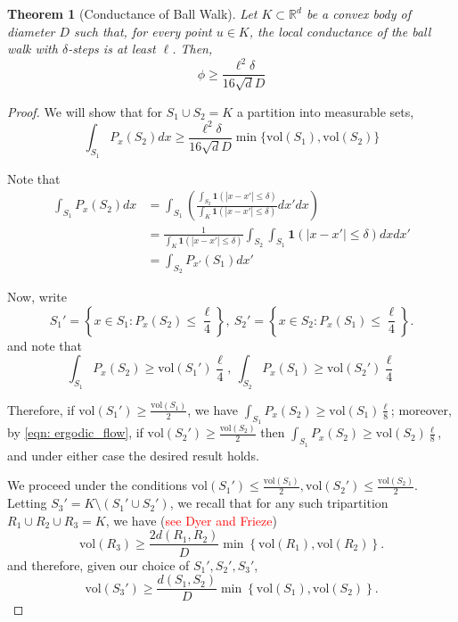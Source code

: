 \documentclass{article}
\newcommand{\Reals}{\mathbb{R}}
\newcommand{\abs}[1]{\left \lvert #1 \right \rvert}
\newcommand{\vol}{\mathrm{vol}}
\newcommand{\set}[1]{\left\{#1\right\}}
\newcommand{\Rd}{\Reals^d}
\newcommand{\1}{\mathbf{1}}
\theoremstyle{alden}
\theoremstyle{aldenthm}
\newtheorem{theorem}{Theorem}
\theoremstyle{remark}
\begin{document}
\begin{theorem}[Conductance of Ball Walk]
	\label{thm: ball_walk_conductance}
	Let $K \subset \Rd$ be a convex body of diameter $D$ such that, for every point $u \in K$, the local conductance of the ball walk with $\delta$-steps is at least $\ell$. Then,
	\begin{equation*}
	\phi \geq \frac{\ell^2 \delta}{16 \sqrt{d} D}
	\end{equation*}
\end{theorem}
\begin{proof}
	We will show that for $S_1 \cup S_2 = K$ a partition into measurable sets,
	\begin{equation*}
	\int_{S_1} P_x(S_2) dx \geq \frac{\ell^2 \delta}{16 \sqrt{d} D} \min \{ \vol(S_1), \vol(S_2) \}
	\end{equation*}
	
	Note that
	\begin{align}
	\label{eqn: ergodic_flow}
	\int_{S_1}P_x(S_2) dx & = \int_{S_1} \left( \frac{\int_{S_2} \1(\abs{x - x'} \leq \delta)}{\int_{K} \1(\abs{x - x'} \leq \delta)} dx' dx \right) \nonumber \\
	& = \frac{1}{\int_{K} \1(\abs{x - x'} \leq \delta)} \int_{S_2} \int_{S_1} \1(\abs{x - x'} \leq \delta) dx dx' \nonumber \\
	& = \int_{S_2}P_{x'}(S_1) dx'
	\end{align}
	
	Now, write
	\begin{equation*}
	S_1' = \set{x \in S_1: P_x(S_2) \leq \frac{\ell}{4}},~ S_2' = \set{x \in S_2: P_x(S_1) \leq \frac{\ell}{4}}.
	\end{equation*}
	and note that 
	\begin{equation*}
	\int_{S_1} P_x(S_2) \geq \vol(S_1') \frac{\ell}{4},~ \int_{S_2} P_x(S_1) \geq \vol(S_2') \frac{\ell}{4}
	\end{equation*}
	
	Therefore, if $\vol(S_1') \geq \frac{\vol(S_1)}{2}$, we have $\int_{S_1} P_x(S_2) \geq \vol(S_1) \frac{\ell}{8}$; moreover, by \eqref{eqn: ergodic_flow}, if $\vol(S_2') \geq \frac{\vol(S_2)}{2}$ then $\int_{S_1} P_x(S_2) \geq \vol(S_2) \frac{\ell}{8}$, and under either case the desired result holds.
	
	We proceed under the conditions $\vol(S_1') \leq \frac{\vol(S_1)}{2}, \vol(S_2') \leq \frac{\vol(S_2)}{2}$. Letting $S_3' = K \setminus (S_1' \cup S_2')$, we recall that for any such tripartition $R_1 \cup R_2 \cup R_3 = K$, we have (\textcolor{red}{see Dyer and Frieze})
	\begin{equation*}
	\vol(R_3) \geq \frac{2 d(R_1,R_2)}{D} \min\set{\vol(R_1), \vol(R_2)}.
	\end{equation*}
	and therefore, given our choice of $S_1', S_2', S_3'$,
	\begin{equation*}
	\vol(S_3') \geq \frac{d(S_1,S_2)}{D} \min\set{\vol(S_1), \vol(S_2)}.
	\end{equation*}
	

\end{proof}
\end{document}
